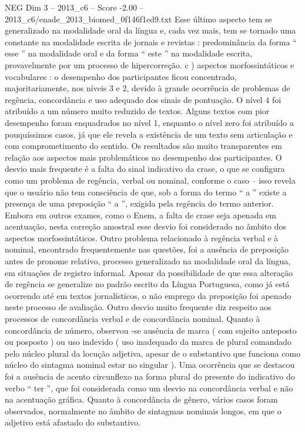 \begin{textsample}{NEG Dim 3 – 2013\_c6 – Score -2.00 – 2013\_c6/enade\_2013\_biomed\_0f146f1ed9.txt}
Esse último aspecto tem se generalizado na modalidade oral da língua e, cada vez mais, tem se tornado uma constante na modalidade escrita de jornais e revistas : predominância da forma “ esse ” na modalidade oral e da forma “ este ” na modalidade escrita, provavelmente por um processo de hipercorreção. c ) aspectos morfossintáticos e vocabulares : o desempenho dos participantes ficou concentrado, majoritariamente, nos níveis 3 e 2, devido à grande ocorrência de problemas de regência, concordância e uso adequado dos sinais de pontuação.
O nível 4 foi atribuído a um número muito reduzido de textos.
Alguns textos com pior desempenho foram enquadrados no nível 1, enquanto o nível zero foi atribuído a pouquíssimos casos, já que ele revela a existência de um texto sem articulação e com comprometimento do sentido.
Os resultados são muito transparentes em relação aos aspectos mais problemáticos no desempenho dos participantes.
O desvio mais frequente é a falta do sinal indicativo da crase, o que se configura como um problema de regência, verbal ou nominal, conforme o caso – isso revela que o usuário não tem consciência de que, sob a forma do termo “ a ” existe a presença de uma preposição “ a ”, exigida pela regência do termo anterior.
Embora em outros exames, como o Enem, a falta de crase seja apenada em acentuação, nesta correção amostral esse desvio foi considerado no âmbito dos aspectos morfossintáticos.
Outro problema relacionado à regência verbal e à nominal, encontrado frequentemente nas questões, foi a ausência de preposição antes de pronome relativo, processo generalizado na modalidade oral da língua, em situações de registro informal.
Apesar da possibilidade de que essa alteração de regência se generalize no padrão escrito da Língua Portuguesa, como já está ocorrendo até em textos jornalísticos, o não emprego da preposição foi apenado neste processo de avaliação.
Outro desvio muito frequente diz respeito aos processos de concordância verbal e de concordância nominal.
Quanto à concordância de número, observou -se ausência de marca ( com sujeito anteposto ou posposto ) ou uso indevido ( uso inadequado da marca de plural comandado pelo núcleo plural da locução adjetiva, apesar de o substantivo que funciona como núcleo do sintagma nominal estar no singular ).
Uma ocorrência que se destacou foi a ausência de acento circunflexo na forma plural do presente do indicativo do verbo “ ter ”, que foi considerada como um desvio na concordância verbal e não na acentuação gráfica.
Quanto à concordância de gênero, vários casos foram observados, normalmente no âmbito de sintagmas nominais longos, em que o adjetivo está afastado do substantivo.

\end{textsample}

